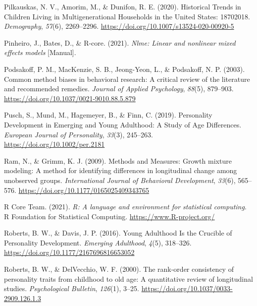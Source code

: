 \documentclass[
  english,
  man, noextraspace,floatsintext]{apa7}
\begin{document}
\leavevmode\hypertarget{ref-pilkauskasHistoricalTrendsChildren2020}{}%
Pilkauskas, N. V., Amorim, M., \& Dunifon, R. E. (2020). Historical Trends in Children Living in Multigenerational Households in the United States: 18702018. \emph{Demography}, \emph{57}(6), 2269--2296. \url{https://doi.org/10.1007/s13524-020-00920-5}

\leavevmode\hypertarget{ref-R-nlme}{}%
Pinheiro, J., Bates, D., \& R-core. (2021). \emph{Nlme: Linear and nonlinear mixed effects models} {[}Manual{]}.

\leavevmode\hypertarget{ref-podsakoffCommonMethodBiases2003}{}%
Podsakoff, P. M., MacKenzie, S. B., Jeong-Yeon, L., \& Podsakoff, N. P. (2003). Common method biases in behavioral research: A critical review of the literature and recommended remedies. \emph{Journal of Applied Psychology}, \emph{88}(5), 879--903. \url{https://doi.org/10.1037/0021-9010.88.5.879}

\leavevmode\hypertarget{ref-puschPersonalityDevelopmentEmerging2019}{}%
Pusch, S., Mund, M., Hagemeyer, B., \& Finn, C. (2019). Personality Development in Emerging and Young Adulthood: A Study of Age Differences. \emph{European Journal of Personality}, \emph{33}(3), 245--263. \url{https://doi.org/10.1002/per.2181}

\leavevmode\hypertarget{ref-ramMethodsMeasuresGrowth2009}{}%
Ram, N., \& Grimm, K. J. (2009). Methods and Measures: Growth mixture modeling: A method for identifying differences in longitudinal change among unobserved groups. \emph{International Journal of Behavioral Development}, \emph{33}(6), 565--576. \url{https://doi.org/10.1177/0165025409343765}

\leavevmode\hypertarget{ref-R-base}{}%
R Core Team. (2021). \emph{R: A language and environment for statistical computing}. R Foundation for Statistical Computing. \url{https://www.R-project.org/}

\leavevmode\hypertarget{ref-robertsYoungAdulthoodCrucible2016}{}%
Roberts, B. W., \& Davis, J. P. (2016). Young Adulthood Is the Crucible of Personality Development. \emph{Emerging Adulthood}, \emph{4}(5), 318--326. \url{https://doi.org/10.1177/2167696816653052}

\leavevmode\hypertarget{ref-robertsRankorderConsistencyPersonality2000}{}%
Roberts, B. W., \& DelVecchio, W. F. (2000). The rank-order consistency of personality traits from childhood to old age: A quantitative review of longitudinal studies. \emph{Psychological Bulletin}, \emph{126}(1), 3--25. \url{https://doi.org/10.1037/0033-2909.126.1.3}
\end{document}
